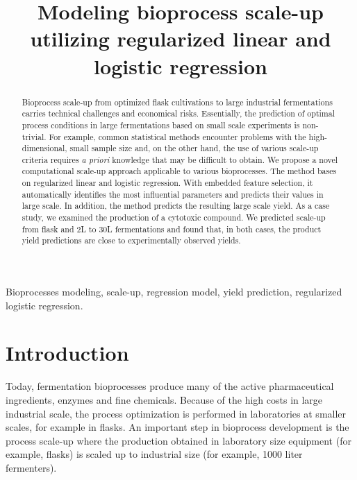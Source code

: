 \documentclass{article}
\title{Modeling bioprocess scale-up utilizing regularized linear and logistic regression}
\begin{document}
%

\maketitle
%
\begin{abstract}
Bioprocess scale-up from optimized flask cultivations to large industrial fermentations carries technical challenges and economical risks. Essentially, the prediction of optimal process conditions in large fermentations based on small scale experiments is non-trivial. For example, common statistical methods encounter problems with the high-dimensional, small sample size and, on the other hand, the use of various scale-up criteria requires \textit{a priori} knowledge that may be difficult to obtain. We propose a novel computational scale-up approach applicable to various bioprocesses. The method bases on regularized linear and logistic regression. With embedded feature selection, it automatically identifies the most influential parameters and predicts their values in large scale. In addition, the method predicts the resulting large scale yield. As a case study, we examined the production of a cytotoxic compound. We predicted scale-up from flask and 2L to 30L fermentations and found that, in both cases, the product yield predictions are close to experimentally observed yields.
\end{abstract}
%
\begin{keywords}
Bioprocesses modeling, scale-up, regression model, yield prediction, regularized logistic regression.
\end{keywords}
%
\section{Introduction}
\label{sec:intro}

Today, fermentation bioprocesses produce many of the active pharmaceutical ingredients, enzymes and fine chemicals. Because of the high costs in large industrial scale, the process optimization is performed in laboratories at smaller scales, for example in flasks. An important step in bioprocess development is the process scale-up where the production obtained in laboratory size equipment (for example, flasks) is scaled up to industrial size (for example, 1000 liter fermenters). 
\end{document}
